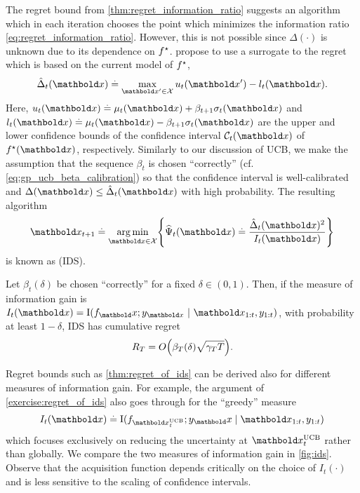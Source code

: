 The regret bound from \cref{thm:regret_information_ratio} suggests an algorithm which in each iteration chooses the point which minimizes the information ratio \eqref{eq:regret_information_ratio}.
However, this is not possible since $\Delta(\cdot)$ is unknown due to its dependence on $f^\star$.
\cite{kirschner2018information} propose to use a surrogate to the regret which is based on the current model of $f^\star$, \begin{align}
  \hat{\Delta}_t(\vx) \defeq \max_{\vxp \in \spX} u_{t}(\vxp) - l_{t}(\vx).
\end{align}
Here, $u_t(\vx) \defeq \mu_t(\vx) + \beta_{t+1} \sigma_t(\vx)$ and $l_t(\vx) \defeq \mu_t(\vx) - \beta_{t+1} \sigma_t(\vx)$ are the upper and lower confidence bounds of the confidence interval $\spC_t(\vx)$ of~$\opt{f}(\vx)$, respectively.
Similarly to our discussion of UCB, we make the assumption that the sequence $\beta_t$ is chosen ``correctly'' (cf. \cref{eq:gp_ucb_beta_calibration}) so that the confidence interval is well-calibrated and $\Delta(\vx) \leq \hat{\Delta}_t(\vx)$ with high probability.
The resulting algorithm \begin{align}
  \vx_{t+1} \defeq \argmin_{\vx \in \spX} \braces*{\widehat{\Psi}_t(\vx) \defeq \frac{\hat{\Delta}_t(\vx)^2}{I_t(\vx)}} \label{eq:ids}
\end{align} is known as  (IDS).

\begin{thm}\label{thm:regret_of_ids} 
  Let $\beta_t(\delta)$ be chosen ``correctly'' for a fixed $\delta \in (0,1)$.
  Then, if the measure of information gain is $I_t(\vx) = \I{f_\vx}{y_{\vx}}[\vx_{1:t}, y_{1:t}]$, with probability at least $1-\delta$, IDS has cumulative regret \begin{align}
    R_T = \BigO{\beta_T(\delta) \sqrt{\gamma_T T}}.
  \end{align}
\end{thm}

Regret bounds such as \cref{thm:regret_of_ids} can be derived also for different measures of information gain.
For example, the argument of \cref{exercise:regret_of_ids} also goes through for the ``greedy'' measure \begin{align}
  I_t(\vx) \defeq \mathrm{I}(f_{\vx_t^{\mathrm{UCB}}} ; y_\vx \mid \vx_{1:t}, y_{1:t}) \label{eq:ucb_info_gain}
\end{align} which focuses exclusively on reducing the uncertainty at $\vx_t^{\mathrm{UCB}}$ rather than globally.
We compare the two measures of information gain in \cref{fig:ids}.
Observe that the acquisition function depends critically on the choice of $I_t(\cdot)$ and is less sensitive to the scaling of confidence intervals.

